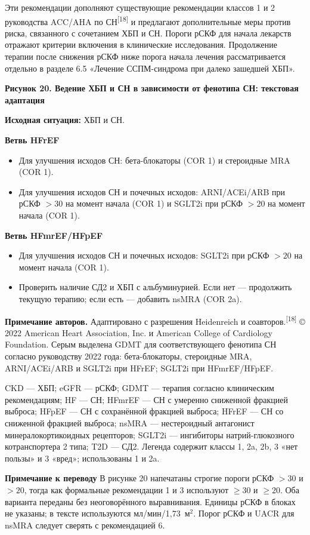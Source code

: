 \documentclass[11pt,a4paper]{article}
\newcommand{\src}[1]{\textsuperscript{[#1]}}
\newcommand{\editorial}[1]{\par\begingroup\small\color{black!70}\textbf{Примечание к переводу} #1\par\endgroup}
\newcommand{\heading}[1]{\par\medskip\textbf{#1}\par}
\newcommand{\unitgfr}{мл/мин/1,73~м$^2$}
\begin{document}
Эти рекомендации дополняют существующие рекомендации классов 1 и 2 руководства ACC/AHA по СН\src{18} и предлагают дополнительные меры против риска, связанного с сочетанием ХБП и СН. Пороги рСКФ для начала лекарств отражают критерии включения в клинические исследования. Продолжение терапии после снижения рСКФ ниже порога начала лечения рассматривается отдельно в разделе 6.5 «Лечение ССПМ-синдрома при далеко зашедшей ХБП».

\heading{Рисунок 20. Ведение ХБП и СН в зависимости от фенотипа СН: текстовая адаптация}
\textbf{Исходная ситуация:} ХБП и СН.
\heading{Ветвь HFrEF}
\begin{itemize}
\item Для улучшения исходов СН: бета-блокаторы (COR 1) и стероидные MRA (COR 1).
\item Для улучшения исходов СН и почечных исходов: ARNI/ACEi/ARB при рСКФ $>30$ на момент начала (COR 1) и SGLT2i при рСКФ $>20$ на момент начала (COR 1).
\end{itemize}
\heading{Ветвь HFmrEF/HFpEF}
\begin{itemize}
\item Для улучшения исходов СН и почечных исходов: SGLT2i при рСКФ $>20$ на момент начала (COR 1).
\item Проверить наличие СД2 и ХБП с альбуминурией. Если нет --- продолжить текущую терапию; если есть --- добавить nsMRA (COR 2a).
\end{itemize}
\textbf{Примечание авторов.} Адаптировано с разрешения Heidenreich и соавторов.\src{18} © 2022 American Heart Association, Inc. и American College of Cardiology Foundation. Серым выделена GDMT для соответствующего фенотипа СН согласно руководству 2022 года: бета-блокаторы, стероидные MRA, ARNI/ACEi/ARB и SGLT2i при HFrEF; SGLT2i при HFmrEF/HFpEF.

CKD --- ХБП; eGFR --- рСКФ; GDMT --- терапия согласно клиническим рекомендациям; HF --- СН; HFmrEF --- СН с умеренно сниженной фракцией выброса; HFpEF --- СН с сохранённой фракцией выброса; HFrEF --- СН со сниженной фракцией выброса; nsMRA --- нестероидный антагонист минералокортикоидных рецепторов; SGLT2i --- ингибиторы натрий-глюкозного котранспортера 2 типа; T2D --- СД2. Легенда содержит классы 1, 2a, 2b, 3 «нет пользы» и 3 «вред»; использованы 1 и 2a.
\editorial{В рисунке 20 напечатаны строгие пороги рСКФ $>30$ и $>20$, тогда как формальные рекомендации 1 и 3 используют $\geq30$ и $\geq20$. Оба варианта переданы без неоговорённого выравнивания. Единицы рСКФ в блоках не указаны; в тексте используются \unitgfr. Порог рСКФ и UACR для nsMRA следует сверять с рекомендацией 6.}
\end{document}
